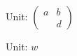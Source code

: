 \documentclass{ctexart}
\begin{document}
Unit: $ \begin{pmatrix}a&b\\&d\end{pmatrix}$

Unit: $ w$
\end{document}

